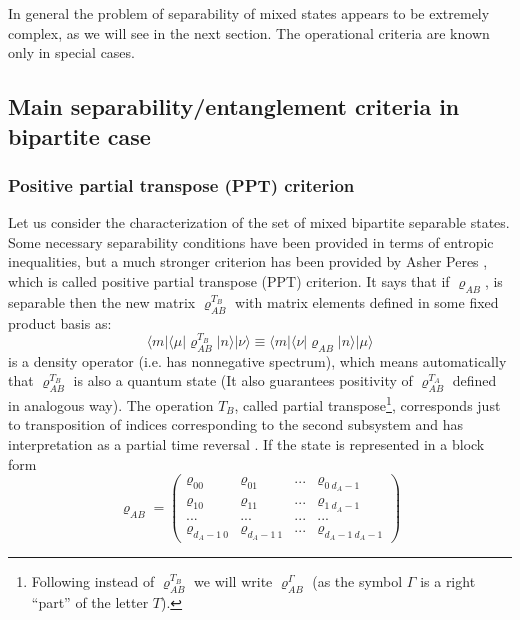 \documentclass[twocolumn,aps,rmp]{revtex4}
\begin{document}
In general the problem of separability of mixed states appears to be
extremely complex, as we will see in the next section. The operational
criteria are known only in special cases.



\subsection{Main separability/entanglement criteria in bipartite case}


\subsubsection{Positive partial transpose (PPT) criterion}

Let us consider the characterization of the set of mixed bipartite
separable states. Some necessary separability conditions have been
provided in terms of entropic inequalities, but a much stronger
criterion has been provided by Asher Peres \cite{Peres96}, which is
called positive partial transpose (PPT) criterion. It says that if
$\varrho_{AB}$, is separable then the new matrix
$\varrho_{AB}^{T_{B}}$ with matrix elements defined in some fixed
product basis as:
\begin{equation}
\langle m| \langle \mu| \varrho_{AB}^{T_{B}} |n \rangle |\nu
\rangle \equiv \langle m| \langle \nu| \varrho_{AB} |n \rangle |\mu
\rangle
\end{equation}
is a density operator (i.e. has nonnegative spectrum), which means
automatically that $\varrho_{AB}^{T_{B}}$ is also a quantum state (It
also guarantees positivity of $\varrho_{AB}^{T_{A}}$ defined in
analogous way). The operation $T_{B}$, called partial transpose\footnote{Following
  \cite{Rains1998-def} instead of $\varrho_{AB}^{T_{B}}$ we will write
  $\varrho_{AB}^{\Gamma}$ (as the symbol $\Gamma$ is a right ``part''
  of the letter $T$).}, corresponds just to
transposition of indices corresponding to the second subsystem and has
interpretation as a partial time reversal
\cite{SanperaTarrachVidal}. If the state is represented in a block
form
\begin{equation}
\varrho_{AB}=\left(\begin{array}{cccc}
\varrho_{00} & \varrho_{01} & ... & \varrho_{0 \ d_{A}-1}\\
\varrho_{10} & \varrho_{11} & ... & \varrho_{1 \ d_{A}-1}\\
 ...  &  ...  & ...   & ...  \\
\varrho_{d_{A}-1 \ 0} & \varrho_{d_{A}-1 \ 1} & ... &
\varrho_{d_{A}-1  \ d_{A}-1}
\label{tablica}
\end{array} \right)
\end{equation}
\end{document}
